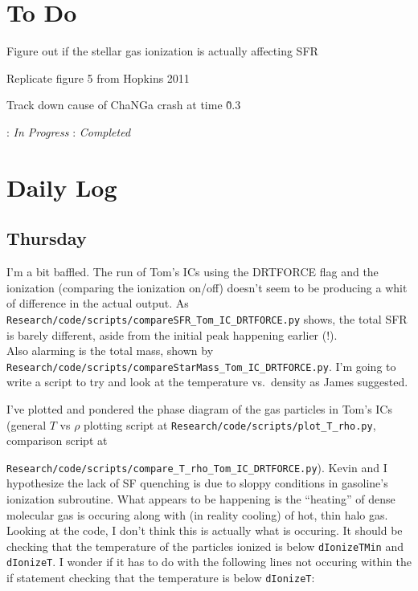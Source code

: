 \documentclass[11pt,letterpaper]{article}
\begin{document}
\section{To Do}
\begin{bullets}
\item Figure out if the stellar gas ionization is actually affecting SFR
\item[\textleaf] Replicate figure 5 from Hopkins 2011
\item Track down cause of ChaNGa crash at time \~0.3
\end{bullets}

\textleaf : \textit{In Progress} \qquad \checkmark : \textit{Completed}
\section{Daily Log}

\subsection{Thursday}

I'm a bit baffled. The run of Tom's ICs using the DRTFORCE flag and the
ionization (comparing the ionization on/off) doesn't seem to be
producing a whit of difference in the actual output. As
\verb!Research/code/scripts/compareSFR_Tom_IC_DRTFORCE.py! shows, the
total SFR is barely different, aside from the initial peak happening
earlier (!).\\Also alarming is the total mass, shown by
\verb!Research/code/scripts/compareStarMass_Tom_IC_DRTFORCE.py!. I'm
going to write a script to try and look at the temperature vs.~density
as James suggested.

I've plotted and pondered the phase diagram of the gas particles in
Tom's ICs (general $T$ vs $\rho$ plotting script at
\verb!Research/code/scripts/plot_T_rho.py!, comparison script at

\verb!Research/code/scripts/compare_T_rho_Tom_IC_DRTFORCE.py!). Kevin
and I hypothesize the lack of SF quenching is due to sloppy conditions
in gasoline's ionization subroutine. What appears to be happening is the
``heating'' of dense molecular gas is occuring along with (in reality
cooling) of hot, thin halo gas. Looking at the code, I don't think this
is actually what is occuring. It should be checking that the temperature
of the particles ionized is below \verb!dIonizeTMin! and
\verb!dIonizeT!. I wonder if it has to do with the following lines not
occuring within the if statement checking that the temperature is below
\verb!dIonizeT!:
\end{document}
